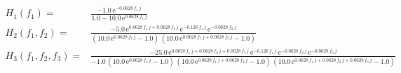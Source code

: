 \begin{align} 
 \scriptstyle H_1(f_1) =& \scriptstyle\frac{- 1.0\, \mathrm{e}^{- 0.0628\, f_1\, j}}{1.0 - 10.0\, \mathrm{e}^{0.0628\, f_1\, j}}\\ 
 \scriptstyle H_2(f_1,f_2) =& \scriptstyle\frac{- 5.0\, \mathrm{e}^{0.0628\, f_1\, j + 0.0628\, f_2\, j}\, \mathrm{e}^{- 0.126\, f_1\, j}\, \mathrm{e}^{- 0.0628\, f_2\, j}}{\left(10.0\, \mathrm{e}^{0.0628\, f_1\, j} - 1.0\right)\, \left(10.0\, \mathrm{e}^{0.0628\, f_1\, j + 0.0628\, f_2\, j} - 1.0\right)}\\ 
 \scriptstyle H_3(f_1,f_2,f_3) =& \scriptstyle\frac{- 25.0\, \mathrm{e}^{0.0628\, f_1\, j + 0.0628\, f_2\, j + 0.0628\, f_3\, j}\, \mathrm{e}^{- 0.126\, f_1\, j}\, \mathrm{e}^{- 0.0628\, f_2\, j}\, \mathrm{e}^{- 0.0628\, f_3\, j}}{- 1.0\, \left(10.0\, \mathrm{e}^{0.0628\, f_1\, j} - 1.0\right)\, \left(10.0\, \mathrm{e}^{0.0628\, f_1\, j + 0.0628\, f_2\, j} - 1.0\right)\, \left(10.0\, \mathrm{e}^{0.0628\, f_1\, j + 0.0628\, f_2\, j + 0.0628\, f_3\, j} - 1.0\right)}
\end{align}